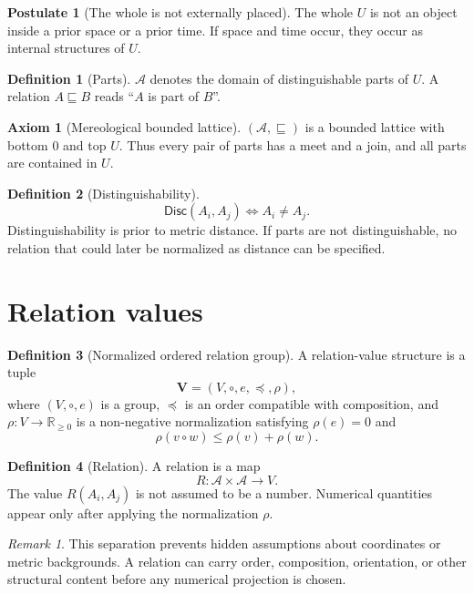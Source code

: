 \documentclass[11pt,a4paper]{article}
\theoremstyle{definition}
\newtheorem{definition}{Definition}[section]
\newtheorem{axiom}{Axiom}[section]
\newtheorem{postulate}{Postulate}[section]
\theoremstyle{plain}
\theoremstyle{remark}
\newtheorem{remark}{Remark}[section]
\newcommand{\Whole}{U}
\newcommand{\Parts}{\mathcal A}
\newcommand{\Rel}{R}
\newcommand{\Values}{V}
\newcommand{\Vstruct}{\mathbf V}
\newcommand{\PartOf}{\sqsubseteq}
\newcommand{\comp}{\circ}
\newcommand{\norm}{\rho}
\newcommand{\Disc}{\mathsf{Disc}}
\begin{document}
\begin{postulate}[The whole is not externally placed]
The whole \(\Whole\) is not an object inside a prior space or a prior time. If
space and time occur, they occur as internal structures of \(\Whole\).
\end{postulate}

\begin{definition}[Parts]
\(\Parts\) denotes the domain of distinguishable parts of \(\Whole\). A relation
\(A\PartOf B\) reads ``\(A\) is part of \(B\)''.
\end{definition}

\begin{axiom}[Mereological bounded lattice]
\((\Parts,\PartOf)\) is a bounded lattice with bottom \(0\) and top \(\Whole\).
Thus every pair of parts has a meet and a join, and all parts are contained in
\(\Whole\).
\end{axiom}

\begin{definition}[Distinguishability]
\[
\Disc(A_i,A_j) \iff A_i \neq A_j .
\]
Distinguishability is prior to metric distance. If parts are not
distinguishable, no relation that could later be normalized as distance can be
specified.
\end{definition}

\section{Relation values}

\begin{definition}[Normalized ordered relation group]
A relation-value structure is a tuple
\[
\Vstruct=(\Values,\comp,e,\preceq,\norm),
\]
where \((\Values,\comp,e)\) is a group, \(\preceq\) is an order compatible with
composition, and \(\norm:\Values\to\mathbb R_{\ge 0}\) is a non-negative
normalization satisfying \(\norm(e)=0\) and
\[
\norm(v\comp w)\leq \norm(v)+\norm(w).
\]
\end{definition}

\begin{definition}[Relation]
A relation is a map
\[
\Rel:\Parts\times\Parts\to\Values .
\]
The value \(\Rel(A_i,A_j)\) is not assumed to be a number. Numerical quantities
appear only after applying the normalization \(\norm\).
\end{definition}

\begin{remark}
This separation prevents hidden assumptions about coordinates or metric
backgrounds. A relation can carry order, composition, orientation, or other
structural content before any numerical projection is chosen.
\end{remark}
\end{document}
